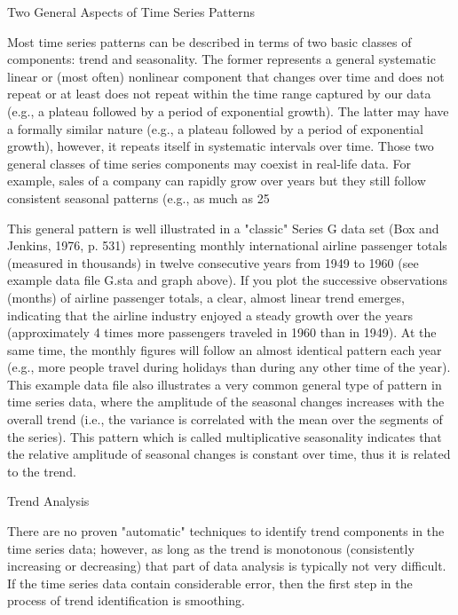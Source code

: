 Two General Aspects of Time Series Patterns

Most time series patterns can be described in terms of two basic classes of components: trend and seasonality. The former represents a general systematic linear or (most often) nonlinear component that changes over time and does not repeat or at least does not repeat within the time range captured by our data (e.g., a plateau followed by a period of exponential growth). The latter may have a formally similar nature (e.g., a plateau followed by a period of exponential growth), however, it repeats itself in systematic intervals over time. Those two general classes of time series components may coexist in real-life data. For example, sales of a company can rapidly grow over years but they still follow consistent seasonal patterns (e.g., as much as 25%



This general pattern is well illustrated in a "classic" Series G data set (Box and Jenkins, 1976, p. 531) representing monthly international airline passenger totals (measured in thousands) in twelve consecutive years from 1949 to 1960 (see example data file G.sta and graph above). If you plot the successive observations (months) of airline passenger totals, a clear, almost linear trend emerges, indicating that the airline industry enjoyed a steady growth over the years (approximately 4 times more passengers traveled in 1960 than in 1949). At the same time, the monthly figures will follow an almost identical pattern each year (e.g., more people travel during holidays than during any other time of the year). This example data file also illustrates a very common general type of pattern in time series data, where the amplitude of the seasonal changes increases with the overall trend (i.e., the variance is correlated with the mean over the segments of the series). This pattern which is called multiplicative seasonality indicates that the relative amplitude of seasonal changes is constant over time, thus it is related to the trend.

Trend Analysis

There are no proven "automatic" techniques to identify trend components in the time series data; however, as long as the trend is monotonous (consistently increasing or decreasing) that part of data analysis is typically not very difficult. If the time series data contain considerable error, then the first step in the process of trend identification is smoothing.

